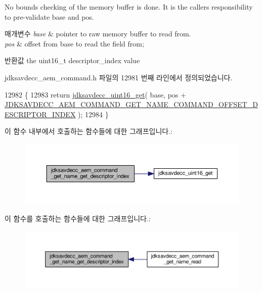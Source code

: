 No bounds checking of the memory buffer is done. It is the caller\textquotesingle{}s responsibility to pre-\/validate base and pos.


\begin{DoxyParams}{매개변수}
{\em base} & pointer to raw memory buffer to read from. \\
\hline
{\em pos} & offset from base to read the field from; \\
\hline
\end{DoxyParams}
\begin{DoxyReturn}{반환값}
the uint16\+\_\+t descriptor\+\_\+index value 
\end{DoxyReturn}


jdksavdecc\+\_\+aem\+\_\+command.\+h 파일의 12981 번째 라인에서 정의되었습니다.


\begin{DoxyCode}
12982 \{
12983     \textcolor{keywordflow}{return} \hyperlink{group__endian_ga3fbbbc20be954aa61e039872965b0dc9}{jdksavdecc\_uint16\_get}( base, pos + 
      \hyperlink{group__command__get__name_ga4b7f9d1481ee58ed08dcd76a1d9659e6}{JDKSAVDECC\_AEM\_COMMAND\_GET\_NAME\_COMMAND\_OFFSET\_DESCRIPTOR\_INDEX}
       );
12984 \}
\end{DoxyCode}


이 함수 내부에서 호출하는 함수들에 대한 그래프입니다.\+:
\nopagebreak
\begin{figure}[H]
\begin{center}
\leavevmode
\includegraphics[width=350pt]{group__command__get__name_gafd3e0e1713eef4a60e5f1a6d25571bd6_cgraph}
\end{center}
\end{figure}




이 함수를 호출하는 함수들에 대한 그래프입니다.\+:
\nopagebreak
\begin{figure}[H]
\begin{center}
\leavevmode
\includegraphics[width=350pt]{group__command__get__name_gafd3e0e1713eef4a60e5f1a6d25571bd6_icgraph}
\end{center}
\end{figure}


